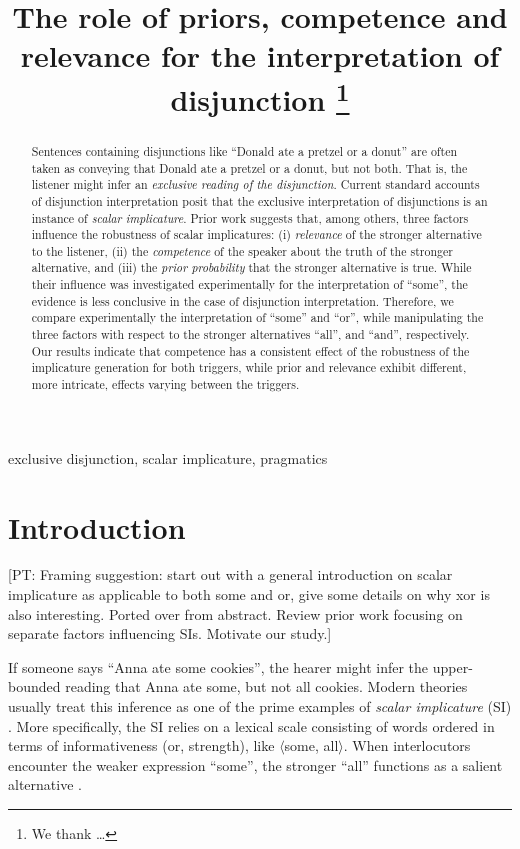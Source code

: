 \documentclass{sp}
\title[Exclusive disjunction]{The role of priors, competence and relevance for the interpretation of disjunction%
  \thanks{We thank \ldots}}
\author[]{%
  \spauthor{Polina Tsvilodub \\ \institute{Institute}} \AND
  \spauthor{Bob van Tiel \\ \institute{Institute}} \AND
  \spauthor{Michael Franke \\ \institute{Department of Linguistics \\ University of Tübigen}}}
\newcommand{\pt}[1]{\textcolor{Cerulean}{[PT: #1]}}
\begin{document}
\maketitle

\begin{abstract}
  
  Sentences containing disjunctions like ``Donald ate a pretzel or a donut'' are often taken as conveying that Donald ate a pretzel or a donut, but not both. That is, the listener might infer an \textit{exclusive reading of the disjunction}. Current standard accounts of disjunction interpretation posit that the exclusive interpretation of disjunctions is an instance of \textit{scalar implicature}. Prior work suggests that, among others, three factors influence the robustness of scalar implicatures: (i) \textit{relevance} of the stronger alternative to the listener, (ii) the \textit{competence} of the speaker about the truth of the stronger alternative, and (iii) the \textit{prior probability} that the stronger alternative is true. While their influence was investigated experimentally for the interpretation of ``some'', the evidence is less conclusive in the case of disjunction interpretation. Therefore, we compare experimentally the interpretation of ``some'' and ``or'', while manipulating the three factors with respect to the stronger alternatives “all”, and “and”, respectively. Our results indicate that competence has a consistent effect of the robustness of the implicature generation for both triggers, while prior and relevance exhibit different, more intricate, effects varying between the triggers.
  
\end{abstract}

\begin{keywords}
 exclusive disjunction, scalar implicature, pragmatics
\end{keywords}

\section{Introduction}

\pt{Framing suggestion: start out with a general introduction on scalar implicature as applicable to both some and or,  give some details on why xor is also interesting. Ported over from abstract. Review prior work focusing on separate factors influencing SIs. Motivate our study.}

If someone says “Anna ate some cookies”, the hearer might infer the upper-bounded reading that Anna ate some, but not all cookies. Modern theories usually treat this inference as one of the prime examples of \textit{scalar implicature} (SI) \citep{horn1972semantic}. More specifically, the SI relies on a lexical scale consisting of words ordered in terms of informativeness (or, strength), like $\langle$some, all$\rangle$. When interlocutors encounter the weaker expression ``some'', the stronger ``all'' functions as a salient alternative \citep{matsumoto1995conversational}. 
\end{document}
